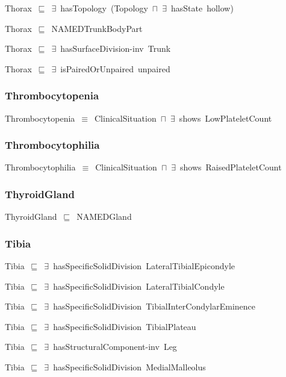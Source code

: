 \documentclass{article}
\begin{document}
Thorax~\ensuremath{\sqsubseteq}~\ensuremath{\exists}~hasTopology~(Topology~\ensuremath{\sqcap}~\ensuremath{\exists}~hasState~hollow)~

Thorax~\ensuremath{\sqsubseteq}~NAMEDTrunkBodyPart~

Thorax~\ensuremath{\sqsubseteq}~\ensuremath{\exists}~hasSurfaceDivision-inv~Trunk~

Thorax~\ensuremath{\sqsubseteq}~\ensuremath{\exists}~isPairedOrUnpaired~unpaired~

\subsubsection*{Thrombocytopenia}

Thrombocytopenia~\ensuremath{\equiv}~ClinicalSituation~\ensuremath{\sqcap}~\ensuremath{\exists}~shows~LowPlateletCount

\subsubsection*{Thrombocytophilia}

Thrombocytophilia~\ensuremath{\equiv}~ClinicalSituation~\ensuremath{\sqcap}~\ensuremath{\exists}~shows~RaisedPlateletCount

\subsubsection*{ThyroidGland}

ThyroidGland~\ensuremath{\sqsubseteq}~NAMEDGland~

\subsubsection*{Tibia}

Tibia~\ensuremath{\sqsubseteq}~\ensuremath{\exists}~hasSpecificSolidDivision~LateralTibialEpicondyle~

Tibia~\ensuremath{\sqsubseteq}~\ensuremath{\exists}~hasSpecificSolidDivision~LateralTibialCondyle~

Tibia~\ensuremath{\sqsubseteq}~\ensuremath{\exists}~hasSpecificSolidDivision~TibialInterCondylarEminence~

Tibia~\ensuremath{\sqsubseteq}~\ensuremath{\exists}~hasSpecificSolidDivision~TibialPlateau~

Tibia~\ensuremath{\sqsubseteq}~\ensuremath{\exists}~hasStructuralComponent-inv~Leg~

Tibia~\ensuremath{\sqsubseteq}~\ensuremath{\exists}~hasSpecificSolidDivision~MedialMalleolus~
\end{document}

